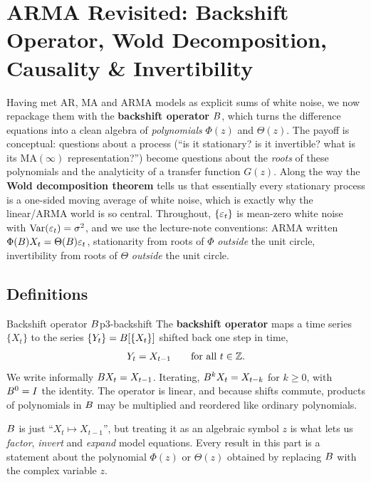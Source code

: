 \section{ARMA Revisited: Backshift Operator, Wold Decomposition, Causality \& Invertibility}
\label{sec:armarev}

Having met AR, MA and ARMA models as explicit sums of white noise, we now
repackage them with the \textbf{backshift operator} $B$, which turns the
difference equations into a clean algebra of \emph{polynomials} $\Phi(z)$ and
$\Theta(z)$. The payoff is conceptual: questions about a process
(``is it stationary? is it invertible? what is its $\mathrm{MA}(\infty)$
representation?'') become questions about the \emph{roots} of these
polynomials and the analyticity of a transfer function $G(z)$. Along the way
the \textbf{Wold decomposition theorem} tells us that essentially every
stationary process is a one-sided moving average of white noise, which is
exactly why the linear/ARMA world is so central. Throughout,
$\{\varepsilon_t\}$ is mean-zero white noise with $\operatorname{Var}(\varepsilon_t)=\sigma^2$, and we use
the lecture-note conventions: ARMA written $\Phi(B)X_t=\Theta(B)\varepsilon_t$,
stationarity from roots of $\Phi$ \emph{outside} the unit circle, invertibility
from roots of $\Theta$ \emph{outside} the unit circle.

\subsection{Definitions}

\begin{definition}{Backshift operator $B$}{p3-backshift}
The \textbf{backshift operator} maps a time series $\{X_t\}$ to the series
$\{Y_t\}=B[\{X_t\}]$ shifted back one step in time,
\[
Y_t = X_{t-1}\qquad\text{for all }t\in\mathbb{Z} .
\]
We write informally $B X_t = X_{t-1}$. Iterating, $B^k X_t = X_{t-k}$
for $k\ge0$, with $B^0=I$ the identity. The operator is linear, and
because shifts commute, products of polynomials in $B$ may be multiplied
and reordered like ordinary polynomials.
\end{definition}

\begin{intuition}
$B$ is just ``$X_{t}\mapsto X_{t-1}$'', but treating it as an algebraic
symbol $z$ is what lets us \emph{factor}, \emph{invert} and \emph{expand}
model equations. Every result in this part is a statement about the polynomial
$\Phi(z)$ or $\Theta(z)$ obtained by replacing $B$ with the complex variable
$z$.
\end{intuition}

